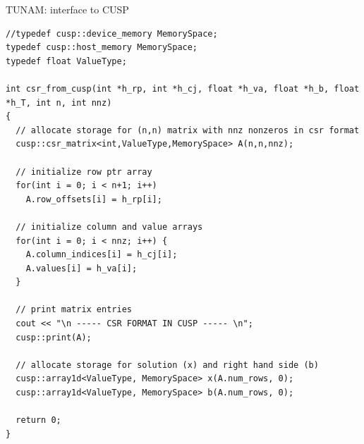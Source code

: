 \documentclass[handout]{beamer}
\begin{document}
\begin{frame}[fragile]{TUNAM: interface to CUSP}


\begin{tiny}

\begin{lstlisting}
//typedef cusp::device_memory MemorySpace;
typedef cusp::host_memory MemorySpace;
typedef float ValueType;

int csr_from_cusp(int *h_rp, int *h_cj, float *h_va, float *h_b, float *h_T, int n, int nnz)
{
  // allocate storage for (n,n) matrix with nnz nonzeros in csr format
  cusp::csr_matrix<int,ValueType,MemorySpace> A(n,n,nnz);    

  // initialize row ptr array
  for(int i = 0; i < n+1; i++) 
    A.row_offsets[i] = h_rp[i];

  // initialize column and value arrays
  for(int i = 0; i < nnz; i++) {
    A.column_indices[i] = h_cj[i];
    A.values[i] = h_va[i];
  }

  // print matrix entries
  cout << "\n ----- CSR FORMAT IN CUSP ----- \n";
  cusp::print(A);

  // allocate storage for solution (x) and right hand side (b)
  cusp::array1d<ValueType, MemorySpace> x(A.num_rows, 0);
  cusp::array1d<ValueType, MemorySpace> b(A.num_rows, 0);

  return 0;
}
\end{lstlisting}
\end{tiny}


\end{frame}

\end{document}
